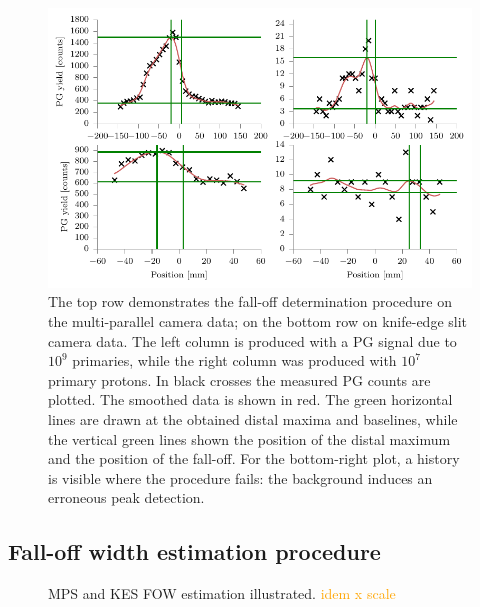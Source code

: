 \documentclass[a4paper,english,12pt]{article}
\newcommand{\ds}[2][orange]{\textcolor{#1}{#2}}
\begin{document}
\begin{figure}[htp]
  \centering
  \includegraphics[width=0.9\linewidth]{fopproc}
  \caption{The top row demonstrates the fall-off determination procedure on the multi-parallel camera data; on the bottom row on knife-edge slit camera data. The left column is produced with a PG signal due to $10^9$ primaries, while the right column was produced with $10^7$ primary protons. In black crosses the measured PG counts are plotted. The smoothed data is shown in red. The green horizontal lines are drawn at the obtained distal maxima and baselines, while the vertical green lines shown the position of the distal maximum and the position of the fall-off. For the bottom-right plot, a history is visible where the procedure fails: the background induces an erroneous peak detection.}
  \label{fig:our-fit}
\end{figure}

\subsection{Fall-off width estimation procedure}

\begin{figure}[htp]
  \centering
  \quad
  \caption{\label{FOWILLUS} MPS and KES FOW estimation illustrated. \ds{idem x scale}}
\end{figure}
\end{document}
